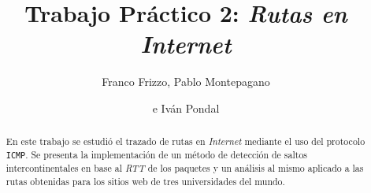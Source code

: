 \documentclass[%
    final,
    notitlepage,
    narroweqnarray,
    inline,
    twoside,
]{ieee}
\begin{document}
\title[Trabajo Práctico 2: Rutas en Internet]{%
       Trabajo Práctico 2: \emph{Rutas en Internet}}

\author[FRIZZO, MONTEPAGANO, PONDAL]{Franco Frizzo, Pablo Montepagano
\and{}e Iván Pondal}


\maketitle

\begin{abstract}
    En este trabajo se estudió el trazado de rutas en \emph{Internet} mediante el uso
    del protocolo \texttt{ICMP}. Se presenta la implementación de un método de
    detección de saltos intercontinentales en base al \emph{RTT} de los paquetes y
    un análisis al mismo aplicado a las rutas obtenidas para los sitios web de
    tres universidades del mundo.
\end{abstract}

\begin{keywords}
\end{keywords}







\end{document}

